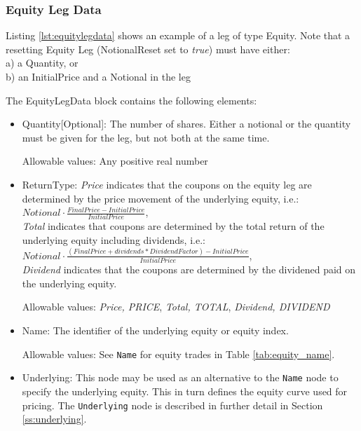 \subsubsection{Equity Leg Data}
\label{ss:equitylegdata}

Listing \ref{lst:equitylegdata} shows an example of a leg of type Equity. Note that a resetting Equity Leg (NotionalReset set to  \emph{true}) must have either: \\
a) a Quantity, or \\
b) an InitialPrice and a Notional in the leg

The EquityLegData block contains the following elements:

\begin{itemize}
\item Quantity[Optional]: The number of shares. Either a notional or the quantity must be given for the leg, but not both at the same time.

  Allowable values: Any positive real number

\item ReturnType: \emph{Price} indicates that the coupons on the equity leg are determined by the  price movement of the underlying equity, i.e.: $Notional \cdot \frac{FinalPrice - InitialPrice} {InitialPrice}$, \\ 
 \emph{Total} indicates that coupons are determined by the total return of the underlying equity including dividends, i.e.: \\
 $Notional \cdot \frac{(FinalPrice + dividends * DividendFactor) - InitialPrice} {InitialPrice}$, \\
 \emph{Dividend} indicates that the coupons are determined by the dividened paid on the underlying equity.
 
Allowable values:  \emph{Price, PRICE}, \emph{Total, TOTAL}, \emph{Dividend, DIVIDEND}

\item Name: The identifier of the underlying equity or equity index.

Allowable values: See \lstinline!Name! for equity trades in Table \ref{tab:equity_name}. \\

\item Underlying:  This node may be used as an alternative to the \lstinline!Name! node to specify the underlying equity. This in turn defines the equity curve used for pricing. The \lstinline!Underlying! node is described in further detail in Section \ref{ss:underlying}. \\


\end{itemize}
